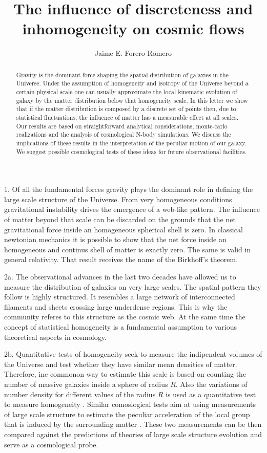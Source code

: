 \documentclass{article}
\title{The influence of discreteness and inhomogeneity on cosmic flows}
\author{Jaime E. Forero-Romero}
\begin{document}
\maketitle
\begin{abstract}

Gravity is the dominant force shaping the spatial distribution of galaxies in
the Universe. Under the assumption of homogeneity and isotropy of the Universe
beyond a certain physical scale one can usually approximate the local
kinematic evolution of galaxy by the matter distribution below that
homogeneity scale. In this letter we show that if the matter
distribution is composed by a discrete set of points then, due to
statistical fluctuations, the influence of matter has a measurable
effect at all scales. Our results are based on straightforward
analytical considerations, monte-carlo realizations and the analysis
of cosmological N-body simulations. We discuss the implications of
these results in the interpretation of the peculiar motion of our
galaxy. We suggest possible cosmological tests of these ideas for
future observational facilities. 



\end{abstract}

1. Of all the fundamental forces gravity plays the dominant role in
defining the large scale structure of the Universe. From very
homogeneous conditions gravitational instability drives the emergence
of a web-like pattern. The influence of
matter beyond that scale can be discarded on the grounds that
the net gravitational force inside an homogeneous spherical
shell is zero. In classical newtonian mechanics it is possible to show
that the net force inside an homogeneous and continus shell of matter
is exactly zero. The same is valid in general relativity. That result
receives the name of the Birkhoff's theorem. 

2a. The observational advances in the last two decades have allowed us
to measure the distribution of galaxies on very large scales. The
spatial pattern they follow is highly structured. It resembles a
large network of interconnected filaments and sheets crossing large
underdense regions.  This is why the community referes to this
structure as the cosmic web. At the same time the concept of
statistical homogeneity is a fundamental assumption to various
theoretical aspects in cosmology. 

2b. Quantitative tests of homogeneity seek to measure the indipendent
volumes of the Universe and test whether they have similar mean
densities of matter. Therefore, ine commonon way to estimate this
scale is based on counting the number of massive galaxies inside a
sphere of radius $R$. Also the variations of number density for
different values of the radius $R$ is used as a quantitative test to
measure homogeneity \cite{Hogg2005}. 
Similar comoslogical tests aim at using measurements of large scale
structure to estimate the peculiar acceleration of the local group
that is induced by the surrounding matter
\cite{Gibelyou2012,Bilicki2012}. These two measurements can be then
compared against the predictions of theories of large scale structure
evolution and serve as a cosmological probe. 
\end{document}
